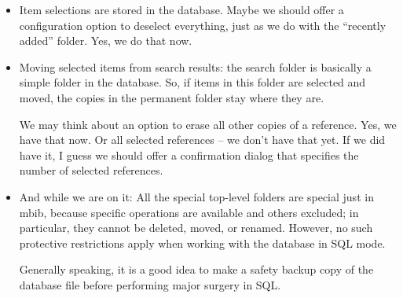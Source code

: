 \documentclass[10pt]{article}
\begin{document}
\begin{itemize}
\item Item selections are stored in the database. Maybe we should offer a configuration option to deselect everything, just as we do with the ``recently added'' folder. Yes, we do that now. 

\item Moving selected items from search results: the search folder is basically a simple folder in the database. So, if items in this folder are selected and moved, the copies in the permanent folder stay where they are. 

We may think about an option to erase all other copies of a reference. Yes, we have that now. Or all selected references -- we don't have that yet. If we did have it, I guess we should offer a confirmation dialog that specifies the number of selected references.

\item And while we are on it: All the special top-level folders are special just in mbib, because specific operations are available and others excluded; in particular, they cannot be deleted, moved, or renamed. However, no such protective restrictions apply when working with the database in SQL mode. 

Generally speaking, it is a good idea to make a safety backup copy of the database file before performing major surgery in SQL. 
\end{itemize}
\end{document}
